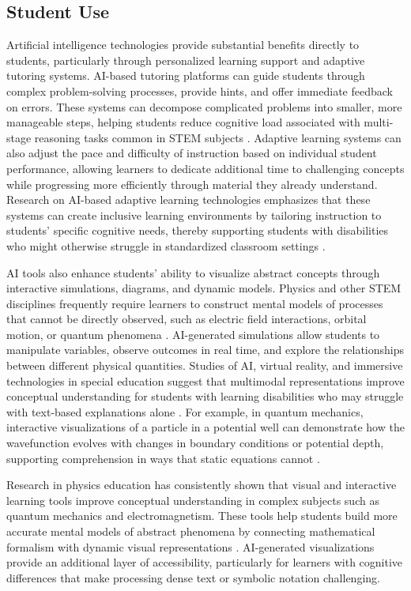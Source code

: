 \documentclass[]{aastex701}
\begin{document}
\subsection{Student Use}

Artificial intelligence technologies provide substantial benefits directly to students, particularly through personalized learning support and adaptive tutoring systems. AI-based tutoring platforms can guide students through complex problem-solving processes, provide hints, and offer immediate feedback on errors. These systems can decompose complicated problems into smaller, more manageable steps, helping students reduce cognitive load associated with multi-stage reasoning tasks common in STEM subjects \citep{Paglialunga2025, Khowaja2025}. Adaptive learning systems can also adjust the pace and difficulty of instruction based on individual student performance, allowing learners to dedicate additional time to challenging concepts while progressing more efficiently through material they already understand. Research on AI-based adaptive learning technologies emphasizes that these systems can create inclusive learning environments by tailoring instruction to students' specific cognitive needs, thereby supporting students with disabilities who might otherwise struggle in standardized classroom settings \citep{Paglialunga2025, Khowaja2025}.

AI tools also enhance students' ability to visualize abstract concepts through interactive simulations, diagrams, and dynamic models. Physics and other STEM disciplines frequently require learners to construct mental models of processes that cannot be directly observed, such as electric field interactions, orbital motion, or quantum phenomena \citep{Finkelstein2005}. AI-generated simulations allow students to manipulate variables, observe outcomes in real time, and explore the relationships between different physical quantities. Studies of AI, virtual reality, and immersive technologies in special education suggest that multimodal representations improve conceptual understanding for students with learning disabilities who may struggle with text-based explanations alone \citep{Voultsiou2025, HarkinsBrown2025}. For example, in quantum mechanics, interactive visualizations of a particle in a potential well can demonstrate how the wavefunction evolves with changes in boundary conditions or potential depth, supporting comprehension in ways that static equations cannot \citep{Finkelstein2005}.

Research in physics education has consistently shown that visual and interactive learning tools improve conceptual understanding in complex subjects such as quantum mechanics and electromagnetism. These tools help students build more accurate mental models of abstract phenomena by connecting mathematical formalism with dynamic visual representations \citep{Finkelstein2005}. AI-generated visualizations provide an additional layer of accessibility, particularly for learners with cognitive differences that make processing dense text or symbolic notation challenging.
\end{document}
